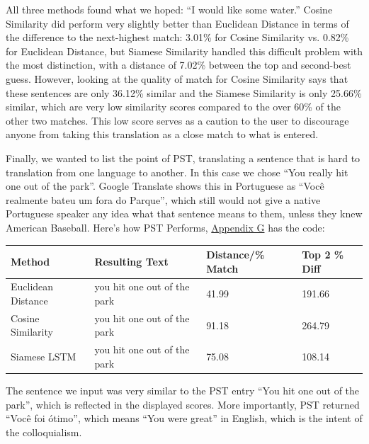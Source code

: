 \documentclass[runningheads]{llncs}
\begin{document}
	All three methods found what we hoped: ``I would like some water.'' Cosine Similarity did perform very slightly better than Euclidean Distance in terms of the difference to the next-highest match: 3.01\% for Cosine Similarity vs. 0.82\% for Euclidean Distance, but Siamese Similarity handled this difficult problem with the most distinction, with a distance of 7.02\% between the top and second-best guess. However, looking at the quality of match for Cosine Similarity says that these sentences are only 36.12\% similar and the Siamese Similarity is only 25.66\% similar, which are very low similarity scores compared to the over 60\% of the other two matches. This low score serves as a caution to the user to discourage anyone from taking this translation as a close match to what is entered.

	Finally, we wanted to list the point of PST, translating a sentence that is hard to translation from one language to another. In this case we chose ``You really hit one out of the park''. Google Translate shows this in Portuguese as ``Você realmente bateu um fora do Parque'', which still would not give a native Portuguese speaker any idea what that sentence means to them, unless they knew American Baseball. Here's how PST Performs, \hyperlink{Appendix G}{Appendix G} has the code:




	\begin{table} 
		\begin{center}
			\begin{tabular}{| l | l | l | l |}
			  \hline			
			  Method & Resulting Text & Distance/\% Match & Top 2 \% Diff \\
			  \hline			
			  Euclidean Distance & you hit one out of the park & 41.99 & 191.66 \\
			  \hline			
			  Cosine Similarity & you hit one out of the park & 91.18 & 264.79 \\
			  \hline  
			  Siamese LSTM & you hit one out of the park & 75.08 & 108.14 \\
			  \hline
			\end{tabular}
		\end{center}
		\label{table:``You Really Hit One Out of the Park'' Test}
	\end{table}

	The sentence we input was very similar to the PST entry ``You hit one out of the park'', which is reflected in the displayed scores. More importantly, PST returned ``Você foi ótimo'', which means ``You were great'' in English, which is the intent of the colloquialism. 
\end{document}

